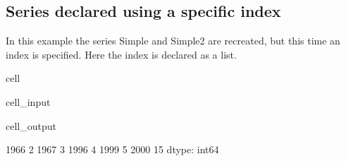 \documentclass[letterpaper,10pt,english]{jupyterBook}
\begin{document}
\subsection{Series declared using a specific index}
\label{\detokenize{content/04_PythonEssentials/PythonPackagesEtc:series-declared-using-a-specific-index}}
\sphinxAtStartPar
In this example the series Simple and Simple2 are  recreated, but this time an index is specified. Here the index is declared as a list.

\begin{sphinxuseclass}{cell}\begin{sphinxVerbatimInput}

\begin{sphinxuseclass}{cell_input}
\begin{sphinxVerbatim}[commandchars=\\\{\}]
\PYG{p}{[}\PYG{p}{]}\PYG{p}{[}\PYG{p}{]}
\end{sphinxVerbatim}

\end{sphinxuseclass}\end{sphinxVerbatimInput}
\begin{sphinxVerbatimOutput}

\begin{sphinxuseclass}{cell_output}
\begin{sphinxVerbatim}[commandchars=\\\{\}]
1966     2
1967     3
1996     4
1999     5
2000   \PYGZhy{}15
dtype: int64
\end{sphinxVerbatim}

\end{sphinxuseclass}\end{sphinxVerbatimOutput}

\end{sphinxuseclass}
\end{document}
